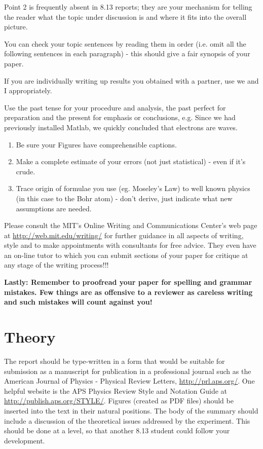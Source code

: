 Point 2 is frequently absent in 8.13 reports; they are your
mechanism for telling the reader what the topic under discussion is
and where it fits into the overall picture.

You can check your topic sentences by reading them in order (i.e.
omit all the following sentences in each paragraph) - this should
give a fair synopsis of your paper.

If you are individually writing up results you obtained with a
partner, use we and I appropriately.

Use the past tense for your procedure and analysis, the past perfect
for preparation and the present for emphasis or conclusions, e.g.
Since we had previously installed Matlab, we quickly concluded that
electrons are waves.

\begin{enumerate}
\item Be sure your Figures have comprehensible captions.

\item Make a complete estimate of your errors (not just statistical) - even
if it's crude.

\item Trace origin of formulae you use (eg. Moseley's Law) to well known
physics (in this case to the Bohr atom) - don't derive, just
indicate what new assumptions are needed.
\end{enumerate}

Please consult the MIT's Online Writing and Communications
Center's web page at \url{http://web.mit.edu/writing/} for further
guidance in all aspects of writing, style and to make appointments
with consultants for free advice.  They even have an on-line tutor
to which you can submit sections of your paper for critique at any
stage of the writing process!!!

{\bf Lastly: Remember to proofread your paper for spelling and grammar
 mistakes.  Few things are as offensive to a reviewer as careless
 writing and such mistakes will count against you!}


\section{Theory}

The report should be type-written in a form that would be suitable
for submission as a manuscript for publication in a professional
journal such as the American Journal of Physics - Physical Review
Letters, \url{http://prl.aps.org/}.  One helpful website is the APS
Physics Review Style and Notation Guide at
\url{http://publish.aps.org/STYLE/}.  Figures (created as PDF files)
should be inserted into the text in their natural positions. The
body of the summary should include a discussion of the theoretical
issues addressed by the experiment.  This should be done at a level,
so that another 8.13 student could follow your development.

